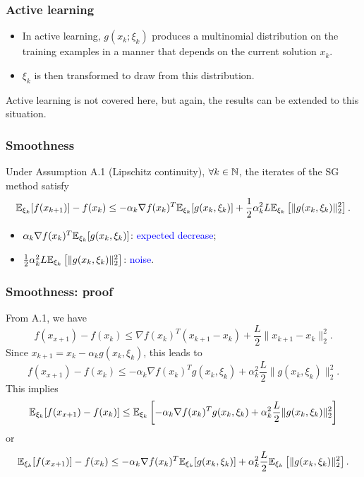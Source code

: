 \documentclass[usepdftitle=false, aspectratio=169]{beamer}
\begin{document}
\begin{frame}
\frametitle{Active learning}

\begin{itemize}
\item 
In active learning, $g(x_k; \xi_k)$ produces a multinomial
distribution on the training examples in a manner that depends on the current solution $x_k$.
\item
$\xi_k$ is then transformed to draw from this distribution.
\end{itemize}

Active learning is not covered here, but again, the results can be extended to this situation.

\end{frame}

\begin{frame}
\frametitle{Smoothness}

\begin{theorem}
Under Assumption A.1 (Lipschitz continuity), $\forall k \in {\mathbb{N}}$, the iterates of the SG method satisfy
$$
{\mathbb{E}}_{\xi_k}[f(x_{k+1})] - f(x_k)
 \leq -\alpha_k \nabla f(x_k)^T{\mathbb{E}}_{\xi_k}[g(x_k,\xi_k)]
+\frac{1}{2} \alpha_k^2 L {\mathbb{E}}_{\xi_k} \left[ \| g(x_k, \xi_k )\|_2^2 \right].
$$
\end{theorem}
\begin{itemize}
	\item $\alpha_k \nabla f(x_k)^T{\mathbb{E}}_{\xi_k}[g(x_k,\xi_k)]$: \textcolor{blue}{expected decrease};
	\item $\frac{1}{2} \alpha_k^2 L {\mathbb{E}}_{\xi_k} \left[ \| g(x_k, \xi_k )\|_2^2 \right]$: \textcolor{blue}{noise}.
\end{itemize}

\end{frame}

\begin{frame}
	\frametitle{Smoothness: proof}
	
	From A.1, we have
	$$
	f(x_{x+1}) - f(x_k) \leq \nabla f(x_k)^T (x_{k+1} - x_k) + \frac{L}{2} \| x_{k+1} - x_k \|^2_2.
	$$
	Since $x_{k+1} = x_k - \alpha_k g(x_k, \xi_k)$, this leads to
	$$
	f(x_{x+1}) - f(x_k) \leq - \alpha_k \nabla f(x_k)^T g(x_k, \xi_k) + \alpha_k^2 \frac{L}{2} \| g(x_k, \xi_k) \|^2_2.
	$$
	This implies
    $$
		{\mathbb{E}}_{\xi_k} [f(x_{x+1}) - f(x_k)] \leq {\mathbb{E}}_{\xi_k} \left[ - \alpha_k \nabla f(x_k)^T g(x_k, \xi_k) + \alpha_k^2 \frac{L}{2} \| g(x_k, \xi_k) \|^2_2 \right]
	$$
	or
	$$
		{\mathbb{E}}_{\xi_k} [f(x_{x+1})] - f(x_k) \leq - \alpha_k \nabla f(x_k)^T {\mathbb{E}}_{\xi_k} [ g(x_k, \xi_k) ] + \alpha_k^2 \frac{L}{2} {\mathbb{E}}_{\xi_k} \left[ \| g(x_k, \xi_k) \|^2_2 \right].	
	$$
	
	\begin{align*}
	\end{align*}
	
\end{frame}
\end{document}
